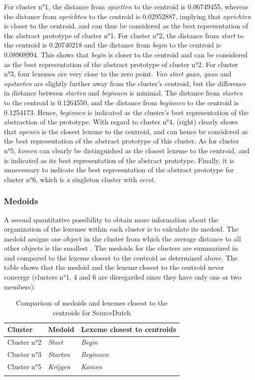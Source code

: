 For cluster n°1, the distance from \textit{opzetten} to the centroid is 0.06749455, whereas the distance from \textit{oprichten} to the centroid is 0.02952887, implying that \textit{oprichten} is closer to the centroid, and can thus be considered as the best representation of the abstract prototype of cluster n°1. For cluster n°2, the distance from \textit{start} to the centroid is 0.20740218 and the distance from \textit{begin} to the centroid is 0.08908994. This shows that \textit{begin} is closer to the centroid and can be considered as the best representation of the abstract prototype of cluster n°2. For cluster n°3, four lexemes are very close to the zero point. \textit{Van} \textit{start} \textit{gaan,} \textit{gaan} and \textit{opstarten} are slightly further away from the cluster’s centroid, but the difference in distance between \textit{starten} and \textit{beginnen} is minimal. The distance from \textit{starten} to the centroid is 0.1264550, and the distance from \textit{beginnen} to the centroid is 0.1254173. Hence, \textit{beginnen} is indicated as the cluster’s best representation of the abstraction of the prototype. With regard to cluster n°4,  (right) clearly shows that \textit{openen} is the closest lexeme to the centroid, and can hence be considered as the best representation of the abstract prototype of this cluster. As for cluster n°5, \textit{komen} can clearly be distinguished as the closest lexeme to the centroid, and is indicated as its best representation of the abstract prototype. Finally, it is unnecessary to indicate the best representation of the abstract prototype for cluster n°6, which is a singleton cluster with \textit{eerst}.

\subsubsection{Medoids}
\label{sec:4.2.3.2}  
A second quantitative possibility to obtain more information about the organization of the lexemes within each cluster is to calculate its medoid. The medoid assigns one object in the cluster from which the average distance to all other objects is the smallest \citep[164]{divjak_structuring_2010}. The medoids for the clusters are summarized in  and compared to the lexeme closest to the centroid as determined above. The table shows that the medoid and the lexeme closest to the centroid never converge (clusters n°1, 4 and 6 are disregarded since they have only one or two members):

\begin{table}
\caption{\label{tab:4:14}Comparison of medoids and lexemes closest to the centroids for SourceDutch}
\begin{tabularx}{\textwidth}{XXl} 
\lsptoprule
Cluster & Medoid & Lexeme closest to centroids\\
\midrule
Cluster n°2 & \itshape Start   & \itshape Begin\\
Cluster n°3 & \itshape Starten & \itshape Beginnen\\
Cluster n°5 & \itshape Krijgen & \itshape Komen\\
\lspbottomrule
\end{tabularx}
\end{table}

